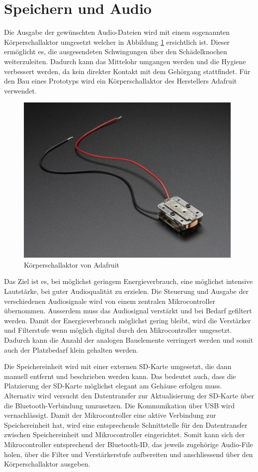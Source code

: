 \section{Speichern und Audio}

Die Ausgabe der gewünschten Audio-Dateien wird mit einem sogenannten Körperschallaktor umgesetzt welcher in Abbildung \ref*{fig:schallaktorAdafruit} ersichtlich ist. Dieser ermöglicht es, die ausgesendeten Schwingungen über den Schädelknochen weiterzuleiten. Dadurch kann das Mittelohr umgangen werden und die Hygiene verbessert werden, da kein direkter Kontakt mit dem Gehörgang stattfindet. Für den Bau eines Prototyps wird ein Körperschallaktor des Herstellers Adafruit verwendet. 

\begin{figure}[H]
\begin{center}
	\includegraphics[width=110mm]{data/Schallaktor.png}
	\caption{Körperschallaktor von Adafruit}
	\label{fig:schallaktorAdafruit}
\end{center}
\end{figure}

Das Ziel ist es, bei möglichst geringem Energieverbrauch, eine möglichst intensive Lautstärke, bei guter Audioqualität zu erzielen.
Die Steuerung und Ausgabe der verschiedenen Audiosignale wird von einem zentralen Mikrocontroller übernommen. Ausserdem muss das Audiosignal verstärkt und bei Bedarf gefiltert werden. Damit der Energieverbrauch möglichst gering bleibt, wird die Verstärker und Filterstufe wenn möglich digital durch den Mikrocontroller umgesetzt. Dadurch kann die Anzahl der analogen Bauelemente verringert werden und somit auch der Platzbedarf klein gehalten werden.

Die Speichereinheit wird mit einer externen SD-Karte umgesetzt, die dann manuell entfernt und beschrieben werden kann. Das bedeutet auch, dass die Platzierung der SD-Karte möglichst elegant am Gehäuse erfolgen muss. Alternativ wird versucht den Datentransfer zur Aktualisierung der SD-Karte über die Bluetooth-Verbindung umzusetzen. Die Kommunikation über USB wird vernachlässigt. Damit der Mikrocontroller eine aktive Verbindung zur Speichereinheit hat, wird eine entsprechende Schnittstelle für den Datentransfer zwischen Speichereinheit und Mikrocontroller eingerichtet. Somit kann sich der Mikrocontroller entsprechend der Bluetooth-ID, das jeweils zugehörige Audio-File holen, über die Filter und Verstärkerstufe aufbereiten und anschliessend über den Körperschallaktor ausgeben.
